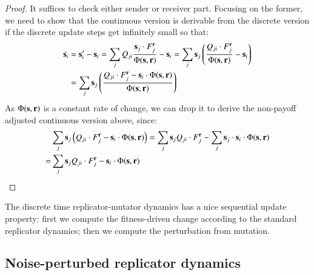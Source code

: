 \begin{proof}
  It suffices to check either sender or receiver part. Focusing on the
  former, we need to show that the continuous version is derivable
  from the discrete version if the discrete update steps get
  infinitely small so that:
  \begin{align*}
    \dot{\mathrm{\mathbf{s}}_i} & = \mathrm{\mathbf{s}}_i' - \mathrm{\mathbf{s}}_i = \sum_{j} Q_{ji}
    \frac{\mathrm{\mathbf{s}}_j \cdot F_j^{\mathrm{\mathbf{r}}}}{ \Phi(\mathrm{\mathbf{s}},\mathrm{\mathbf{r}})} -
    \mathrm{\mathbf{s}}_i = \sum_{j} \mathrm{\mathbf{s}}_j \left ( \frac{ Q_{ji} \cdot
        F_j^{\mathrm{\mathbf{r}}}}{ \Phi(\mathrm{\mathbf{s}},\mathrm{\mathbf{r}})} - \mathrm{\mathbf{s}}_i \right ) \\
    & = \sum_{j} \mathrm{\mathbf{s}}_j \left ( \frac{ Q_{ji} \cdot
        F_j^{\mathrm{\mathbf{r}}} - \mathrm{\mathbf{s}}_i \cdot \Phi(\mathrm{\mathbf{s}},\mathrm{\mathbf{r}})}{ \Phi(\mathrm{\mathbf{s}},\mathrm{\mathbf{r}})}  \right )
  \end{align*}
  As $\Phi(\mathrm{\mathbf{s}},\mathrm{\mathbf{r}})$ is a constant rate of change, we can drop
  it to derive the non-payoff adjusted continuous version above,
  since:
  \begin{align*}
    & \sum_{j} \mathrm{\mathbf{s}}_j \left ( Q_{ji} \cdot
        F_j^{\mathrm{\mathbf{r}}} - \mathrm{\mathbf{s}}_i \cdot \Phi(\mathrm{\mathbf{s}},\mathrm{\mathbf{r}})  \right
      ) =     \sum_{j} \mathrm{\mathbf{s}}_j  Q_{ji} \cdot
        F_j^{\mathrm{\mathbf{r}}} - \sum_{j} \mathrm{\mathbf{s}}_j \cdot \mathrm{\mathbf{s}}_i \cdot
        \Phi(\mathrm{\mathbf{s}},\mathrm{\mathbf{r}}) \\
       = &    \sum_{j} \mathrm{\mathbf{s}}_j  Q_{ji} \cdot
        F_j^{\mathrm{\mathbf{r}}} - \mathrm{\mathbf{s}}_i \cdot
        \Phi(\mathrm{\mathbf{s}},\mathrm{\mathbf{r}}) 
  \end{align*}
\end{proof}

The discrete time replicator-mutator dynamics has a nice sequential
update property: first we compute the fitness-driven change according
to the standard replicator dynamics; then we compute the perturbation
from mutation.

\subsection{Noise-perturbed replicator dynamics}

